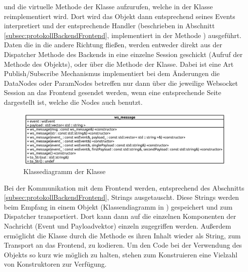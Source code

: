 und die virtuelle Methode  der  Klasse aufzurufen, welche in der  Klasse reimplementiert wird.
Dort wird das  Objekt dann entsprechend seines Events interpretiert und der entsprechende Handler (beschrieben in Abschnitt \ref{subsec:protokollBackendFrontend}, 
implementiert in der Methode ) ausgeführt.
Daten die in die andere Richtung fließen, werden entweder direkt aus der Dispatcher Methode des Backends in eine einzelne Session geschickt (Aufruf der Methode  des  Objekts), 
oder über die Methode  der  Klasse.
Dabei ist eine Art Publish/Subscribe Mechanismus implementiert bei dem Änderungen die DataNodes oder ParamNodes betreffen nur dann über die jeweilige Websocket Session an das Frontend gesendet werden, wenn eine entsprechende Seite dargestellt ist, welche die Nodes auch benutzt.
\begin{figure}[ht]
  \centering
  \includegraphics[width=\textwidth]{content/hauptteil/umsetzungPoC/backend/uml/classesOfOverview/ws_message.pdf}
  \caption{Klassediagramm der Klasse }
  \label{fig:backend:classDiag:wsMsg}
\end{figure}
Bei der Kommunikation mit dem Frontend werden, entsprechend des Abschnitts \ref{subsec:protokollBackendFrontend}, Strings ausgetauscht. 
Diese Strings werden beim Empfang in einem  Objekt (Klassendiagramm in ) gespeichert und zum Dispatcher transportiert. 
Dort kann dann auf die einzelnen Komponenten der Nachricht (Event und Payloadvektor) einzeln zugegriffen werden.
Außerdem ermöglicht die Klasse durch die Methode  es ihren Inhalt wieder als String, zum Transport an das Frontend, zu kodieren.
Um den Code bei der Verwendung des  Objekts so kurz wie möglich zu halten, stehen zum Konstruieren eine Vielzahl von Konstruktoren zur Verfügung.
